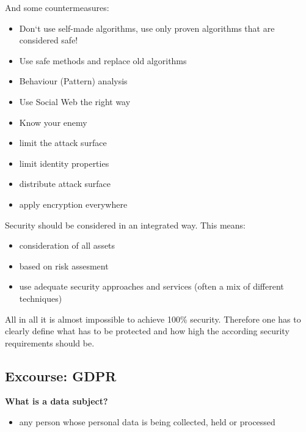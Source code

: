\documentclass[11pt]{article}
\begin{document}
And some countermeasures:
\begin{itemize}
\item Don‘t use self-made algorithms, use only proven algorithms that are considered safe!
\item Use safe methods and replace old algorithms
\item Behaviour (Pattern) analysis
\item Use Social Web the right way
\item Know your enemy
\item limit the attack surface
\item limit identity properties
\item distribute attack surface
\item apply encryption everywhere
\end{itemize}

Security should be considered in an integrated way. This means:
\begin{itemize}
\item consideration of all assets
\item based on risk assesment
\item use adequate security approaches and services (often a mix of different techniques)
\end{itemize}

All in all it is almost impossible to achieve 100\% security. Therefore one has to clearly define what has to be protected and how high the according security requirements should be.

\subsection{Excourse: GDPR}
\label{sec:org840614e}
\textbf{What is a data subject?}
\begin{itemize}
\item any person whose personal data is being collected, held or processed
\end{itemize}
\end{document}
